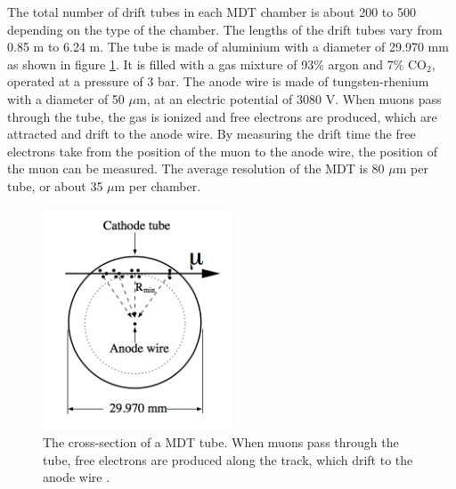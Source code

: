 The total number of drift tubes in each MDT chamber is about 200 to 500 depending on the type of the chamber.
The lengths of the drift tubes vary from 0.85 m to 6.24 m.
The tube is made of aluminium with a diameter of 29.970 mm as shown in figure \ref{fig:MDT}.
It is filled with a gas mixture of 93\% argon and 7\% CO$_2$, operated at a pressure of 3 bar.
The anode wire is made of tungsten-rhenium with a diameter of 50 $\mu$m, at an electric potential of 3080 V.
When muons pass through the tube, the gas is ionized and free electrons are produced, which are attracted and drift to the anode wire.
By measuring the drift time the free electrons take from the position of the muon to the anode wire, the position of the muon can be measured.
The average resolution of the MDT is 80 $\mu$m per tube, or about 35 $\mu$m per chamber.

\begin{figure}
\centering
\includegraphics[width=0.5\textwidth]{data/photo/detector/MDT.png}
\caption{The cross-section of a MDT tube. When muons pass through the tube, free electrons are produced along the track, which drift to the anode wire \cite{ATLAS_doc}.}
\label{fig:MDT}
\end{figure}
